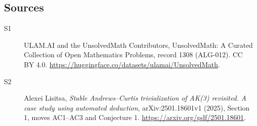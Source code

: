 \documentclass[11pt]{article}
\begin{document}
\subsection{Sources}
\begin{description}
\item[\hypertarget{source:1308:1}{S1}] ULAM.AI and the UnsolvedMath Contributors, UnsolvedMath: A Curated Collection of Open Mathematics Problems, record 1308 (ALG-012). CC BY 4.0. \url{https://huggingface.co/datasets/ulamai/UnsolvedMath}.
\item[\hypertarget{source:1308:2}{S2}] Alexei Lisitsa, \emph{Stable Andrews--Curtis trivialization of AK(3) revisited. A case study using automated deduction}, arXiv:2501.18601v1 (2025), Section 1, moves AC1--AC3 and Conjecture 1. \url{https://arxiv.org/pdf/2501.18601}.
\end{description}
\label{end:1308}
\end{document}
